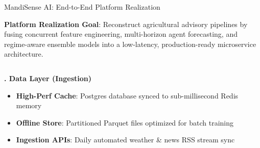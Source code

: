 \documentclass{beamer}
\begin{document}
\begin{frame}{MandiSense AI: End-to-End Platform Realization}
\vspace{-0.25cm}

\begin{herocard}[0.98\textwidth, top=1.5pt, bottom=1.5pt, left=6pt, right=6pt, boxsep=0.5pt]
    \centering \fontsize{6.5pt}{7.5pt}\selectfont
    \textbf{\textcolor{primaryDark}{Platform Realization Goal}}: Reconstruct agricultural advisory pipelines by fusing concurrent feature engineering, multi-horizon agent forecasting, and regime-aware ensemble models into a low-latency, production-ready microservice architecture.
\end{herocard}

\vspace{0.02cm}

\begin{columns}[T]
    
    \begin{smallcard}[0.98\textwidth, top=1.5pt, bottom=1.5pt, left=4pt, right=4pt, boxsep=0.5pt]
        \textbf{\textcolor{primaryDark}{\fontsize{6.5pt}{7.5pt}. Data Layer (Ingestion)}}
        \vspace{0.02cm}
        \begin{itemize}\setlength\itemsep{0.5pt}\setlength\parskip{0pt}
            \tiny
            \item \textbf{High-Perf Cache}: Postgres database synced to sub-millisecond Redis memory
            \item \textbf{Offline Store}: Partitioned Parquet files optimized for batch training
            \item \textbf{Ingestion APIs}: Daily automated weather \& news RSS stream sync
        \end{itemize}
    \end{smallcard}
    
    \vspace{-0.02cm}
    {\centering\textcolor{primaryLight}{\fontsize{5pt}{6pt}\selectfont {}}\par}
    \vspace{-0.02cm}
    

\end{columns}
\end{frame}
\end{document}
